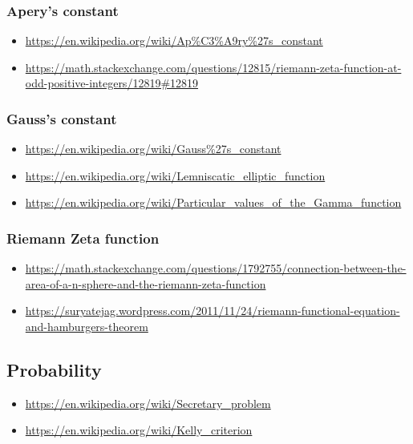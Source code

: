 \subsubsection{Apery's constant}
\begin{itemize}
\item \url{https://en.wikipedia.org/wiki/Ap%C3%A9ry%27s_constant}
\item \url{https://math.stackexchange.com/questions/12815/riemann-zeta-function-at-odd-positive-integers/12819#12819}
\end{itemize}

\subsubsection{Gauss's constant}
\begin{itemize}
\item \url{https://en.wikipedia.org/wiki/Gauss\%27s_constant}
\item \url{https://en.wikipedia.org/wiki/Lemniscatic_elliptic_function}
\item \url{https://en.wikipedia.org/wiki/Particular_values_of_the_Gamma_function}
\end{itemize}

\subsubsection{Riemann Zeta function}
\begin{itemize}
\item \url{https://math.stackexchange.com/questions/1792755/connection-between-the-area-of-a-n-sphere-and-the-riemann-zeta-function}
\item \url{https://suryatejag.wordpress.com/2011/11/24/riemann-functional-equation-and-hamburgers-theorem}
\end{itemize}


\subsection{Probability}
\begin{itemize}
\item \url{https://en.wikipedia.org/wiki/Secretary_problem}
\item \url{https://en.wikipedia.org/wiki/Kelly_criterion}
\end{itemize}

